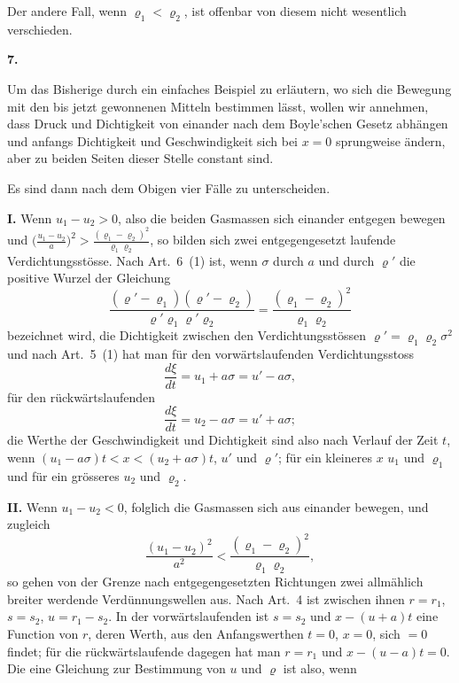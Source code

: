\documentclass[12pt,a4paper]{book}
\theoremstyle{definition}
\theoremstyle{remark}
\begin{document}
Der andere Fall, wenn $\varrho_{1} < \varrho_{2}$, ist offenbar von diesem nicht wesentlich verschieden.

\newpage
\begin{center}
\textbf{7.}
\end{center}

Um das Bisherige durch ein einfaches Beispiel zu erl\"autern, wo sich die Bewegung mit den bis jetzt gewonnenen Mitteln bestimmen l\"asst, wollen wir annehmen, dass Druck und Dichtigkeit von einander nach dem Boyle'schen Gesetz abh\"angen und anfangs Dichtigkeit und Geschwindigkeit sich bei $x = 0$ sprungweise \"andern, aber zu beiden Seiten dieser Stelle constant sind.

Es sind dann nach dem Obigen vier F\"alle zu unterscheiden.

\smallskip
\noindent\textbf{I.} Wenn $u_{1} - u_{2} > 0$, also die beiden Gasmassen sich einander entgegen bewegen und $\bigl(\frac{u_{1} - u_{2}}{a}\bigr)^{2} > \frac{(\varrho_{1} - \varrho_{2})^{2}}{\varrho_{1}\varrho_{2}}$, so bilden sich zwei entgegengesetzt laufende Verdichtungsst\"osse. Nach Art.~6~(1) ist, wenn $\sigma$ durch $a$ und durch $\varrho'$ die positive Wurzel der Gleichung
\[
\frac{(\varrho' - \varrho_{1})(\varrho' - \varrho_{2})}{\varrho'\varrho_{1}\varrho'\varrho_{2}} = \frac{(\varrho_{1} - \varrho_{2})^{2}}{\varrho_{1}\varrho_{2}}
\]
bezeichnet wird, die Dichtigkeit zwischen den Verdichtungsst\"ossen $\varrho' = \varrho_{1}\varrho_{2}\sigma^{2}$ und nach Art.~5~(1) hat man f\"ur den vorw\"artslaufenden Verdichtungsstoss
\[
\frac{d\xi}{dt} = u_{1} + a\sigma = u' - a\sigma,
\]
f\"ur den r\"uckw\"artslaufenden
\[
\frac{d\xi}{dt} = u_{2} - a\sigma = u' + a\sigma;
\]
die Werthe der Geschwindigkeit und Dichtigkeit sind also nach Verlauf der Zeit $t$, wenn $(u_{1} - a\sigma)t < x < (u_{2} + a\sigma)t$, $u'$ und $\varrho'$; f\"ur ein kleineres $x$ $u_{1}$ und $\varrho_{1}$ und f\"ur ein gr\"osseres $u_{2}$ und $\varrho_{2}$.

\smallskip
\noindent\textbf{II.} Wenn $u_{1} - u_{2} < 0$, folglich die Gasmassen sich aus einander bewegen, und zugleich
\[
\frac{(u_{1} - u_{2})^{2}}{a^{2}} < \frac{(\varrho_{1} - \varrho_{2})^{2}}{\varrho_{1}\varrho_{2}},
\]
so gehen von der Grenze nach entgegengesetzten Richtungen zwei allm\"ahlich breiter werdende Verd\"unnungswellen aus. Nach Art.~4 ist zwischen ihnen $r = r_{1}$, $s = s_{2}$, $u = r_{1} - s_{2}$. In der vorw\"artslaufenden ist $s = s_{2}$ und $x - (u + a)t$ eine Function von $r$, deren Werth, aus den Anfangswerthen $t = 0$, $x = 0$, sich $= 0$ findet; f\"ur die r\"uckw\"artslaufende dagegen hat man $r = r_{1}$ und $x - (u - a)t = 0$. Die eine Gleichung zur Bestimmung von $u$ und $\varrho$ ist also, wenn
\end{document}
